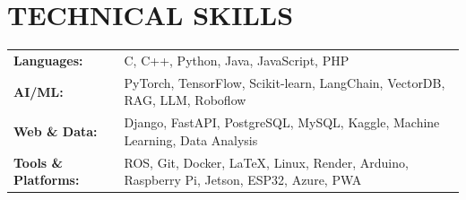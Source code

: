 \documentclass[a4paper,10pt]{article}
\begin{document}
\section*{TECHNICAL SKILLS}
\begin{tabular}{@{}ll@{}}
\textbf{Languages:} & C, C++, Python, Java, JavaScript, PHP \\
\textbf{AI/ML:} & PyTorch, TensorFlow, Scikit-learn, LangChain, VectorDB, RAG, LLM, Roboflow \\
\textbf{Web \& Data:} & Django, FastAPI, PostgreSQL, MySQL, Kaggle, Machine Learning, Data Analysis \\
\textbf{Tools \& Platforms:} & ROS, Git, Docker, LaTeX, Linux, Render, Arduino, Raspberry Pi, Jetson, ESP32, Azure, PWA
\end{tabular}

\vspace{0.1cm}
\end{document}
